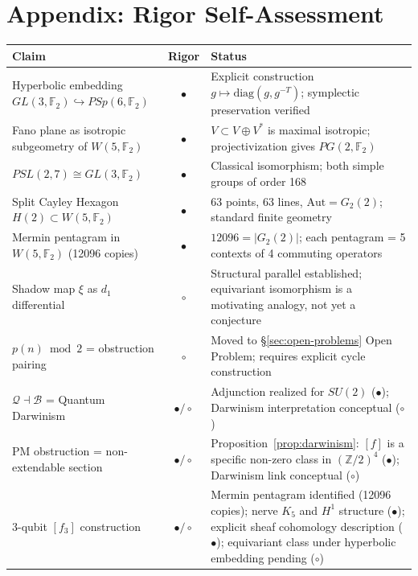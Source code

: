 \documentclass[11pt,a4paper]{article}
\theoremstyle{remark}
\newcommand{\Z}{\mathbb{Z}}
\newcommand{\F}{\mathbb{F}}
\begin{document}
\section*{Appendix: Rigor Self-Assessment}

\begin{table}[H]
\centering\small
\setlength{\tabcolsep}{4pt}
\begin{tabular}{l c p{6.5cm}}
\toprule
Claim & Rigor & Status \\
\midrule
Hyperbolic embedding $GL(3,\F_2) \hookrightarrow PSp(6,\F_2)$ & $\bullet$ &
  Explicit construction $g \mapsto \mathrm{diag}(g, g^{-T})$; symplectic
  preservation verified \\
Fano plane as isotropic subgeometry of $W(5,\F_2)$ & $\bullet$ &
  $V \subset V \oplus V^*$ is maximal isotropic; projectivization gives
  $PG(2,\F_2)$ \\
$PSL(2,7) \cong GL(3,\F_2)$ & $\bullet$ &
  Classical isomorphism; both simple groups of order 168 \\
Split Cayley Hexagon $H(2) \subset W(5,\F_2)$ & $\bullet$ &
  63 points, 63 lines, $\mathrm{Aut} = G_2(2)$; standard finite geometry \\
Mermin pentagram in $W(5,\F_2)$ (12096 copies) & $\bullet$ &
  $12096 = |G_2(2)|$; each pentagram = 5 contexts of 4 commuting operators \\
Shadow map $\xi$ as $d_1$ differential & $\circ$ &
  Structural parallel established; equivariant isomorphism is a motivating
  analogy, not yet a conjecture \\
$p(n) \bmod 2$ = obstruction pairing & $\circ$ &
  Moved to \S\ref{sec:open-problems} Open Problem; requires explicit cycle
  construction \\
$\mathcal{Q} \dashv \mathcal{B}$ = Quantum Darwinism & $\bullet/\circ$ &
  Adjunction realized for $SU(2)$ ($\bullet$); Darwinism interpretation
  conceptual ($\circ$) \\
PM obstruction = non-extendable section & $\bullet/\circ$ &
  Proposition~\ref{prop:darwinism}: $[f]$ is a specific non-zero class in
  $(\Z/2)^4$ ($\bullet$); Darwinism link conceptual ($\circ$) \\
3-qubit $[f_3]$ construction & $\bullet/\circ$ &
  Mermin pentagram identified (12096 copies); nerve $K_5$ and $H^1$
  structure ($\bullet$); explicit sheaf cohomology description ($\bullet$);
  equivariant class under hyperbolic embedding pending ($\circ$) \\

\end{tabular}
\end{table}
\end{document}
